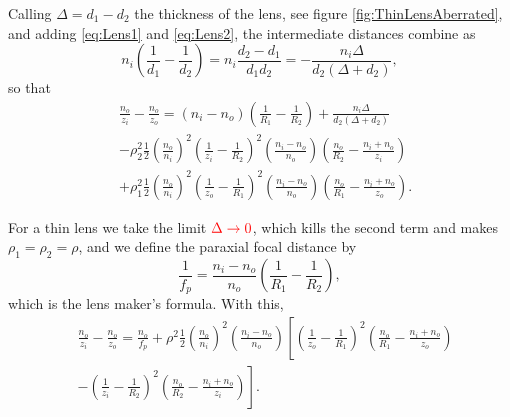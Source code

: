                 Calling $\Delta = d_1-d_2$ the thickness of the lens, see figure \ref{fig:ThinLensAberrated}, and adding \ref{eq:Lens1} and \ref{eq:Lens2}, the intermediate distances combine as
                \begin{equation*}
                    n_i\left( \frac{1}{d_1} - \frac{1}{d_2} \right) = n_i\frac{d_2-d_1}{d_1d_2} = -\frac{n_i\Delta}{d_2\left(\Delta+d_2\right)},
                \end{equation*}
                so that
                \begin{align}
                    & \frac{n_o}{z_i} - \frac{n_o}{z_o} = \left( n_i-n_o \right)\left( \frac{1}{R_1}-\frac{1}{R_2} \right) + \frac{n_i\Delta}{d_2\left(\Delta+d_2\right)} \nonumber\\
                    & - \rho_2^2\frac{1}{2}\left( \frac{n_o}{n_i} \right)^2\left( \frac{1}{z_i}-\frac{1}{R_2} \right)^2\left( \frac{n_i-n_o}{n_o} \right)\left( \frac{n_o}{R_2}-\frac{n_i+n_o}{z_i} \right) \nonumber\\
                    & + \rho_1^2\frac{1}{2}\left( \frac{n_o}{n_i} \right)^2\left( \frac{1}{z_o}-\frac{1}{R_1} \right)^2\left( \frac{n_i-n_o}{n_o} \right)\left( \frac{n_o}{R_1}-\frac{n_i+n_o}{z_o} \right).\label{eq:ThickLens}
                \end{align}

                For a thin lens we take the limit ${\color{red}\Delta\to0}$, which kills the second term and makes $\rho_1=\rho_2=\rho$, and we define the paraxial focal distance by
                \begin{equation}\label{eq:ThinLensFocal}
                    \frac{1}{f_p} = \frac{n_i-n_o}{n_o}\left( \frac{1}{R_1} - \frac{1}{R_2} \right),
                \end{equation}
                which is the lens maker's formula. With this,
                \begin{align}
                    & \frac{n_o}{z_i} - \frac{n_o}{z_o} = \frac{n_o}{f_p} + \rho^2\frac{1}{2}\left( \frac{n_o}{n_i} \right)^2\left( \frac{n_i-n_o}{n_o} \right)\left[ \left( \frac{1}{z_o}-\frac{1}{R_1} \right)^2\left( \frac{n_o}{R_1}-\frac{n_i+n_o}{z_o} \right) \right. \nonumber\\
                    & \left. - \left( \frac{1}{z_i}-\frac{1}{R_2} \right)^2\left( \frac{n_o}{R_2}-\frac{n_i+n_o}{z_i} \right) \right].\label{eq:ThinLensAberrated}
                \end{align}

